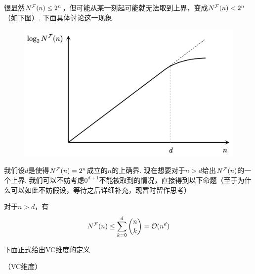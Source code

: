 很显然$N^{\mathcal{F}}(n) \le 2^n$，但可能从某一刻起可能就无法取到上界，变成$N^{\mathcal{F}}(n) < 2^n$（如下图）. 下面具体讨论这一现象.

\begin{figure}[h]
    \centering
    \includegraphics[width=.7\textwidth]{pic/C2_vc-dimension.png}
\end{figure} 

我们设$d$是使得$N^{\mathcal{F}}(n) = 2^n$成立的$n$的上确界. 现在想要对于$n>d$给出$N^{\mathcal{F}}(n)$的一个上界. 我们可以不妨考虑$0^{d+1}$不能被取到的情况，直接得到以下命题（至于为什么可以如此不妨假设，等待之后详细补充，现暂时留作思考）
\begin{proposition}
    对于$n > d$，有 
    \[
    N^{\mathcal{F}}(n) \le \sum_{k=0}^{d} \binom{n}{k} = \mathcal{O}(n^d)
    \]
\end{proposition}

下面正式给出VC维度的定义
\begin{definition} （VC维度）
    
\end{definition}